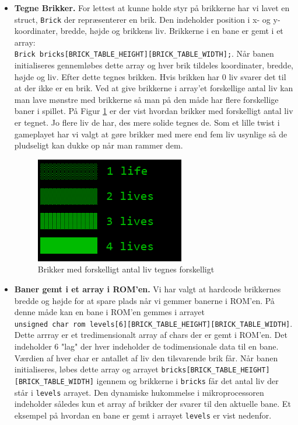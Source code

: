 \begin{itemize}
\item \textbf{Tegne Brikker.} For lettest at kunne holde styr på brikkerne har vi lavet en struct, \texttt{Brick} der repræsenterer en brik. Den indeholder position i x- og y-koordinater, bredde, højde og brikkens liv. Brikkerne i en bane er gemt i et array:\\ \texttt{Brick bricks[BRICK\_TABLE\_HEIGHT][BRICK\_TABLE\_WIDTH];}. Når banen initialiseres gennemløbes dette array og hver brik tildeles koordinater, bredde, højde og liv. Efter dette tegnes brikken. Hvis brikken har 0 liv svarer det til at der ikke er en brik. Ved at give brikkerne i array'et forskellige antal liv kan man lave mønstre med brikkerne så man på den måde har flere forskellige baner i spillet. På Figur \ref{fig:brikker} er der vist hvordan brikker med forskelligt antal liv er tegnet. Jo flere liv de har, des mere solide tegnes de. Som et lille twist i gameplayet har vi valgt at gøre brikker med mere end fem liv usynlige så de pludseligt kan dukke op når man rammer dem. 
\begin{figure}[h!]
\centering
\includegraphics[scale=1]{figs/brikker.png}
\caption{Brikker med forskelligt antal liv tegnes forskelligt}
\label{fig:brikker}
\end{figure}
\item \textbf{Baner gemt i et array i ROM'en.} Vi har valgt at hardcode brikkernes bredde og højde for at spare plads når vi gemmer banerne i ROM'en. På denne måde kan en bane i ROM'en gemmes i arrayet\\ \texttt{unsigned char rom levels[6][BRICK\_TABLE\_HEIGHT][BRICK\_TABLE\_WIDTH]}. Dette arrray er et tredimensionalt array af chars der er gemt i ROM'en. Det indeholder 6 "lag" der hver indeholder de todimensionale data til en bane. Værdien af hver char er antallet af liv den tilsvarende brik får. Når banen initialiseres, løbes dette array og arrayet \texttt{bricks[BRICK\_TABLE\_HEIGHT][BRICK\_TABLE\_WIDTH]} igennem og brikkerne i \texttt{bricks} får det antal liv der står i \texttt{levels} arrayet. Den dynamiske hukommelse i mikroprocessoren indeholder således kun et array af brikker der svarer til den aktuelle bane. Et eksempel på hvordan en bane er gemt i arrayet \texttt{levels} er vist nedenfor.

\end{itemize}
